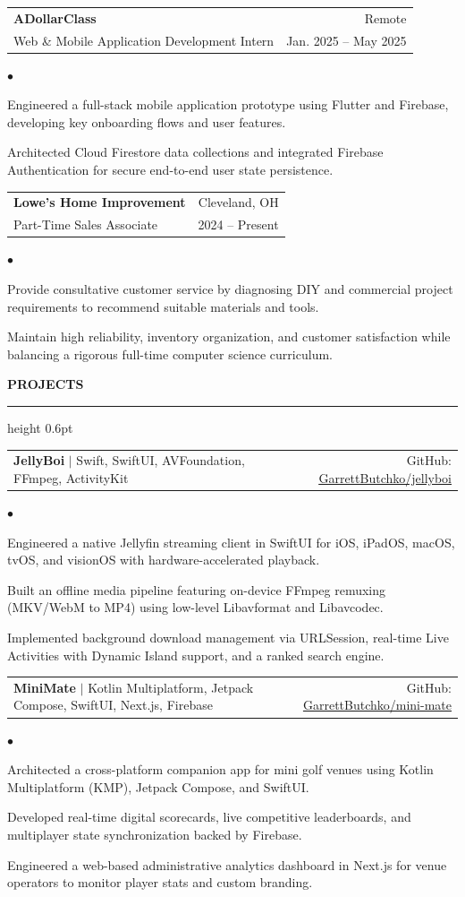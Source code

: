 \documentclass[letterpaper,10pt]{article}
\makeatletter
\newcommand{\resumesection}[1]{%
  \vspace{4pt}%
  {\large\textbf{\uppercase{#1}}}%
  \vspace{1pt}\hrule height 0.6pt\vspace{3pt}%
}
\newenvironment{resumelist}{%
  \begin{list}{$\bullet$}{%
    \setlength{\leftmargin}{1.2em}%
    \setlength{\itemsep}{1pt}%
    \setlength{\parsep}{0pt}%
    \setlength{\topsep}{1.5pt}%
    \setlength{\partopsep}{0pt}%
  }%
}{%
  \end{list}%
}
\newcommand{\resumeSubheading}[4]{%
  \vspace{2pt}%
  \begin{tabular*}{1.0\textwidth}[t]{l@{\extracolsep{\fill}}r}%
    \textbf{#1} & #2 \\%
    \small #3 & \small #4 \\%
  \end{tabular*}\vspace{-1pt}%
}
\newcommand{\resumeProjectHeading}[2]{%
  \vspace{2pt}%
  \begin{tabular*}{1.0\textwidth}{l@{\extracolsep{\fill}}r}%
    \small#1 & #2 \\%
  \end{tabular*}\vspace{-1pt}%
}
\makeatother
\begin{document}
  \resumeSubheading
    {ADollarClass}{Remote}
    {Web \& Mobile Application Development Intern}{Jan. 2025 -- May 2025}
    \begin{resumelist}
      \item \small{Engineered a full-stack mobile application prototype using Flutter and Firebase, developing key onboarding flows and user features.}
      \item \small{Architected Cloud Firestore data collections and integrated Firebase Authentication for secure end-to-end user state persistence.}
    \end{resumelist}

  \resumeSubheading
    {Lowe's Home Improvement}{Cleveland, OH}
    {Part-Time Sales Associate}{2024 -- Present}
    \begin{resumelist}
      \item \small{Provide consultative customer service by diagnosing DIY and commercial project requirements to recommend suitable materials and tools.}
      \item \small{Maintain high reliability, inventory organization, and customer satisfaction while balancing a rigorous full-time computer science curriculum.}
    \end{resumelist}

\resumesection{Projects}

  \resumeProjectHeading
    {\textbf{JellyBoi} $\vert$ \textnormal{Swift, SwiftUI, AVFoundation, FFmpeg, ActivityKit}}{\small GitHub: \href{https://github.com/GarrettButchko/jellyboi}{\underline{GarrettButchko/jellyboi}}}
    \begin{resumelist}
      \item \small{Engineered a native Jellyfin streaming client in SwiftUI for iOS, iPadOS, macOS, tvOS, and visionOS with hardware-accelerated playback.}
      \item \small{Built an offline media pipeline featuring on-device FFmpeg remuxing (MKV/WebM to MP4) using low-level Libavformat and Libavcodec.}
      \item \small{Implemented background download management via URLSession, real-time Live Activities with Dynamic Island support, and a ranked search engine.}
    \end{resumelist}

  \resumeProjectHeading
    {\textbf{MiniMate} $\vert$ \textnormal{Kotlin Multiplatform, Jetpack Compose, SwiftUI, Next.js, Firebase}}{\small GitHub: \href{https://github.com/GarrettButchko/mini-mate}{\underline{GarrettButchko/mini-mate}}}
    \begin{resumelist}
      \item \small{Architected a cross-platform companion app for mini golf venues using Kotlin Multiplatform (KMP), Jetpack Compose, and SwiftUI.}
      \item \small{Developed real-time digital scorecards, live competitive leaderboards, and multiplayer state synchronization backed by Firebase.}
      \item \small{Engineered a web-based administrative analytics dashboard in Next.js for venue operators to monitor player stats and custom branding.}
    \end{resumelist}
\end{document}
